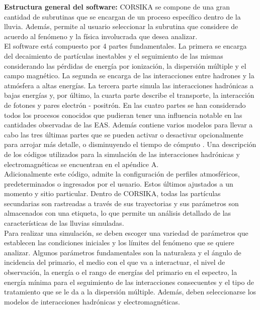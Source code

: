 \textbf{Estructura general del software:} CORSIKA se compone de una gran cantidad de subrutinas que se encargan de un proceso específico dentro de la lluvia.  Además, permite al usuario seleccionar la subrutina que considere de acuerdo al fenómeno y la física involucrada que desea analizar.\\

El software está compuesto por 4 partes fundamentales. La primera se encarga del decaimiento de partículas inestables y el seguimiento de las mismas considerando las pérdidas de energía por ionización, la dispersión múltiple y el campo magnético. La segunda se encarga de las interacciones entre hadrones y la atmósfera a altas energías. La tercera parte simula las interacciones hadrónicas a bajas energías y, por último, la cuarta parte describe el transporte, la interacción de fotones y pares electrón - positrón. En las cuatro partes se han considerado todos los procesos conocidos que pudieran tener una influencia notable en las cantidades observadas de las EAS. Además contiene varios modelos para llevar a cabo las tres últimas partes que se pueden activar o desactivar opcionalmente para arrojar más detalle, o disminuyendo el tiempo de cómputo \parencite{Heck1998}. Una descripción de los códigos utilizados para la simulación de las interacciones hadrónicas y electromagnéticas se encuentran en el apéndice A.\\

Adicionalmente este código, admite la configuración de perfiles atmosféricos, predeterminados o ingresados por el usuario. Estos últimos ajustados a un momento y sitio particular. Dentro de CORSIKA, todas las partículas secundarias son rastreadas a través de sus trayectorias y sus parámetros son almacenados con una etiqueta, lo que permite un análisis detallado de las características de las lluvias simuladas.\\

Para realizar una simulación, se deben escoger una variedad de parámetros que establecen las condiciones iniciales y los límites del fenómeno que se quiere analizar. Algunos parámetros fundamentales son la naturaleza y el ángulo de incidencia del primario, el medio con el que va a interactuar, el nivel de observación, la energía o el rango de energías del primario en el espectro, la energía mínima para el seguimiento de las interacciones consecuentes y el tipo de tratamiento que se le da a la dispersión múltiple. Además, deben seleccionarse los modelos de interacciones hadrónicas y electromagnéticas.\\

